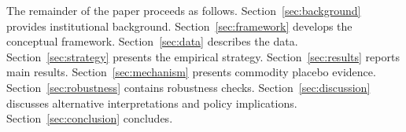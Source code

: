 The remainder of the paper proceeds as follows.
Section~\ref{sec:background} provides institutional background.
Section~\ref{sec:framework} develops the conceptual framework.
Section~\ref{sec:data} describes the data.
Section~\ref{sec:strategy} presents the empirical strategy.
Section~\ref{sec:results} reports main results.
Section~\ref{sec:mechanism} presents commodity placebo evidence.
Section~\ref{sec:robustness} contains robustness checks.
Section~\ref{sec:discussion} discusses alternative
interpretations and policy implications.
Section~\ref{sec:conclusion} concludes.

